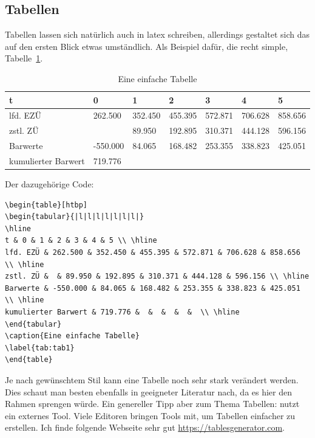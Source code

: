 \subsection{Tabellen}
\label{sec:tables}
Tabellen lassen sich natürlich auch in \gls{latex} schreiben, allerdings gestaltet sich das auf den ersten Blick etwas umständlich. Als Beispiel dafür, die recht simple, Tabelle~\ref{tab:tab1}.
\begin{table}[htbp]
\begin{tabular}{|l|l|l|l|l|l|l|}
\hline
t & 0 & 1 & 2 & 3 & 4 & 5 \\ \hline
lfd. EZÜ & 262.500 & 352.450 & 455.395 & 572.871 & 706.628 & 858.656 \\ \hline
zstl. ZÜ &  & 89.950 & 192.895 & 310.371 & 444.128 & 596.156 \\ \hline
Barwerte & -550.000 & 84.065 & 168.482 & 253.355 & 338.823 & 425.051 \\ \hline
kumulierter Barwert & 719.776 &  &  &  &  &  \\ \hline
\end{tabular}
\caption{Eine einfache Tabelle}
\label{tab:tab1}
\end{table}

Der dazugehörige Code:
\begin{lstlisting}
\begin{table}[htbp]
\begin{tabular}{|l|l|l|l|l|l|l|}
\hline
t & 0 & 1 & 2 & 3 & 4 & 5 \\ \hline
lfd. EZÜ & 262.500 & 352.450 & 455.395 & 572.871 & 706.628 & 858.656 \\ \hline
zstl. ZÜ &  & 89.950 & 192.895 & 310.371 & 444.128 & 596.156 \\ \hline
Barwerte & -550.000 & 84.065 & 168.482 & 253.355 & 338.823 & 425.051 \\ \hline
kumulierter Barwert & 719.776 &  &  &  &  &  \\ \hline
\end{tabular}
\caption{Eine einfache Tabelle}
\label{tab:tab1}
\end{table}
\end{lstlisting}

Je nach gewünschtem Stil kann eine Tabelle noch sehr stark verändert werden. Dies schaut man besten ebenfalls in geeigneter Literatur nach, da es hier den Rahmen sprengen würde.
Ein genereller Tipp aber zum Thema Tabellen: nutzt ein externes Tool. Viele Editoren bringen Tools mit, um Tabellen einfacher zu erstellen. Ich finde folgende Webseite sehr gut \href{https://tablesgenerator.com}{https://tablesgenerator.com}.

